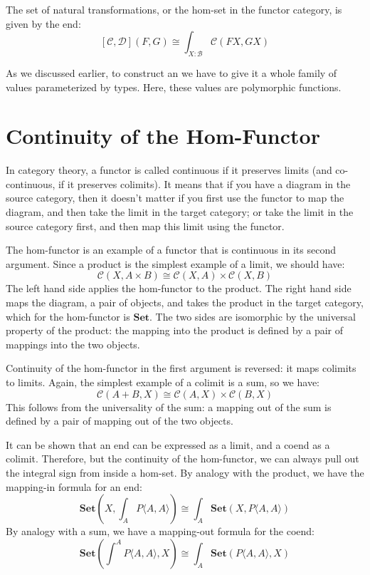 \documentclass[DaoFP]{subfiles}
\begin{document}
The set of natural transformations, or the hom-set in the functor category, is given by the end:
\[ [\mathcal{C}, \mathcal{D}] (F, G) \cong \int_{X \colon  \mathcal{B}} \mathcal{C}(FX, GX)\]

As we discussed earlier, to construct an  we have to give it a whole family of values parameterized by types. Here, these values are polymorphic functions. 

\section{Continuity of the Hom-Functor}

In category theory, a functor is called continuous if it preserves limits (and co-continuous, if it preserves colimits). It means that if you have a diagram in the source category, then it doesn't matter if you first use the functor to map the diagram, and then take the limit in the target category; or take the limit in the source category first, and then map this limit using the functor. 

The hom-functor is an example of a functor that is continuous in its second argument. Since a product is the simplest example of a limit, we should have:
\[ \mathcal{C}(X, A \times B) \cong \mathcal{C}(X, A) \times \mathcal{C}(X, B) \]
The left hand side applies the hom-functor to the product. The right hand side maps the diagram, a pair of objects, and takes the product in the target category, which for the hom-functor is $\mathbf{Set}$. The two sides are isomorphic by the universal property of the product: the mapping into the product is defined by a pair of mappings into the two objects. 

Continuity of the hom-functor in the first argument is reversed: it maps colimits to limits. Again, the simplest example of a colimit is a sum, so we have:
\[ \mathcal{C}(A + B, X) \cong \mathcal{C}(A, X) \times \mathcal{C}(B, X) \]
This follows from the universality of the sum: a mapping out of the sum is defined by a pair of mapping out of the two objects.

It can be shown that an end can be expressed as a limit, and a coend as a colimit. Therefore, but the continuity of the hom-functor, we can always pull out the integral sign from inside a hom-set. By analogy with the product, we have the mapping-in formula for an end:
\[ \mathbf{Set}\left(X, \int_A P\langle A, A \rangle \right) \cong \int_A  \mathbf{Set}(X, P\langle A, A \rangle) \]
By analogy with a sum, we have a mapping-out formula for the coend:
\[ \mathbf{Set}\left( \int^A P\langle A, A \rangle , X\right) \cong \int_A  \mathbf{Set}(P\langle A, A \rangle, X) \]
\end{document}
